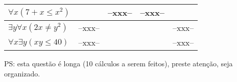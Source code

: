 \documentclass[a4paper,11pt]{article}
\begin{document}
\begin{enumerate}
\begin{center}
\begin{tabular}{l|c|c|c|c}
$\forall x (7+x \leq x^2)$ & & --xxx-- & --xxx--  & \\ \hline
$\exists y \forall x (2x \neq y^2)$ & --xxx-- &  & & --xxx-- \\ \hline
$\forall x \exists y (xy \leq 40)$ & --xxx-- &  & & --xxx-- \\ \hline \hline
\end{tabular}
\end{center}
PS: esta questão é longa (10 cálculos a serem feitos), preste atenção, seja organizado.




\end{enumerate}
\end{document}

